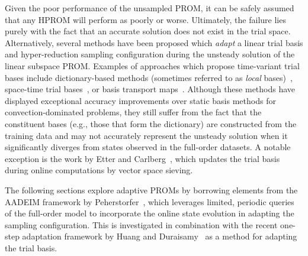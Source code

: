 Given the poor performance of the unsampled PROM, it can be safely assumed that any HPROM will perform as poorly or worse. Ultimately, the failure lies purely with the fact that an accurate solution does not exist in the trial space. Alternatively, several methods have been proposed which \textit{adapt} a linear trial basis and hyper-reduction sampling configuration during the unsteady solution of the linear subspace PROM. Examples of approaches which propose time-variant trial bases include dictionary-based methods (sometimes referred to as \textit{local} bases)~\cite{Amsallem2012,Peherstorfer2014,Abgrall2016}, space-time trial bases~\cite{Choi2019,Hoang2022}, or basis transport maps~\cite{Iollo2014}. Although these methods have displayed exceptional accuracy improvements over static basis methods for convection-dominated problems, they still suffer from the fact that the constituent bases (e.g., those that form the dictionary) are constructed from the training data and may not accurately represent the unsteady solution when it significantly diverges from states observed in the full-order datasets. A notable exception is the work by Etter and Carlberg~\cite{Etter2019}, which updates the trial basis during online computations by vector space sieving.

The following sections explore adaptive PROMs by borrowing elements from the AADEIM framework by Peherstorfer~\cite{Peherstorfer2015,Peherstorfer2020Adaptive}, which leverages limited, periodic queries of the full-order model to incorporate the online state evolution in adapting the sampling configuration. This is investigated in combination with the recent one-step adaptation framework by Huang and Duraisamy~\cite{Huang2022a} as a method for adapting the trial basis.

